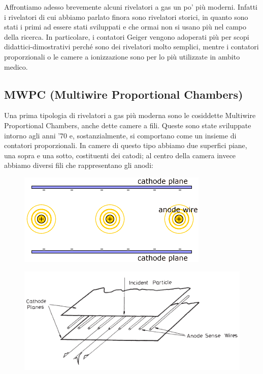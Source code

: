 Affrontiamo adesso brevemente alcuni rivelatori a gas un po' più moderni. Infatti i rivelatori di cui abbiamo parlato finora sono rivelatori storici, in quanto sono stati i primi ad essere stati sviluppati e che ormai non si usano più nel campo della ricerca. In particolare, i contatori Geiger vengono adoperati più per scopi didattici-dimostrativi perché sono dei rivelatori molto semplici, mentre i contatori proporzionali o le camere a ionizzazione sono per lo più utilizzate in ambito medico.

\subsection{MWPC (Multiwire Proportional Chambers)}

Una prima tipologia di rivelatori a gas più moderna sono le cosiddette Multiwire Proportional Chambers, anche dette camere a fili. Queste sono state sviluppate intorno agli anni '70 e, sostanzialmente, si comportano come un insieme di contatori proporzionali. In camere di questo tipo abbiamo due superfici piane, una sopra e una sotto, costituenti dei catodi; al centro della camera invece abbiamo diversi fili che rappresentano gli anodi:

\begin{minipage}{0.49\textwidth}
   \begin{figure}[H]
      \centering
      \includegraphics[width=\textwidth]{immagini/MWPC_1.png}
   \end{figure}
\end{minipage}
\hfill
\begin{minipage}{0.49\textwidth}
   \begin{figure}[H]
      \centering
      \includegraphics[width=\textwidth]{immagini/MWPC_2.png}
   \end{figure}
\end{minipage}

